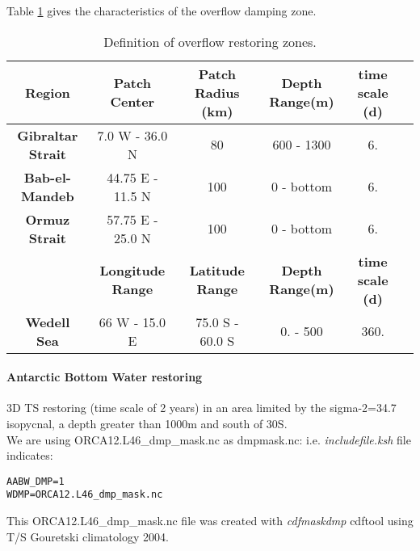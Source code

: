  Table \ref{tableoverflowdmp} gives the characteristics of the overflow damping zone.
\begin{table}[h]
\begin{center}
\begin{tabular}{|c|c|c|c|c|c|}
\hline
\textbf{Region} & \textbf{Patch Center}        & \textbf{Patch Radius (km)}  & \textbf{Depth Range(m)}  & \textbf{ time scale (d)} \\
\hline
\textbf{Gibraltar Strait}  & 7.0 W - 36.0 N    &  80                       &  600 - 1300              & 6.     \\
\textbf{Bab-el-Mandeb}     & 44.75 E - 11.5 N  &  100                      &  0 - bottom              & 6.     \\
\textbf{Ormuz Strait}      & 57.75 E - 25.0 N  &  100                      &  0 - bottom              & 6.     \\
\hline
\hline
\textbf{  }        & \textbf{Longitude Range} & \textbf{Latitude Range}  & \textbf{Depth Range(m)}  & \textbf{ time scale (d)} \\
\hline
\textbf{Wedell Sea}    & 66 W - 15.0 E            & 75.0 S - 60.0 S          &  0. - 500             & 360.      \\
\hline
\end{tabular}
\label{tableoverflowdmp}
\caption{ Definition of overflow restoring zones.}
\end{center}
\end{table}


\paragraph{Antarctic Bottom Water restoring \\}

3D TS restoring (time scale of 2 years) in an area limited by the sigma-2=34.7 isopycnal, a depth greater than 1000m and south of 30S. \\

We are using ORCA12.L46\_dmp\_mask.nc as dmpmask.nc: i.e. \textit{includefile.ksh} file indicates:
\begin{verbatim}
AABW_DMP=1
WDMP=ORCA12.L46_dmp_mask.nc
\end{verbatim}

This ORCA12.L46\_dmp\_mask.nc file was created with \textit{cdfmaskdmp} cdftool using T/S Gouretski climatology 2004. \\


